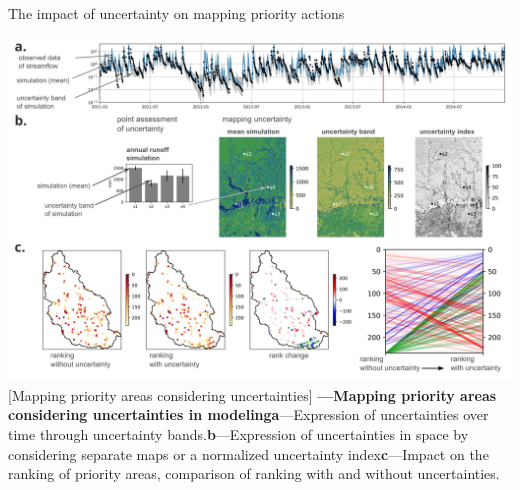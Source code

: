 \documentclass[./main_en.tex]{subfiles}
\begin{document}
\begin{simplebox}[
    float=ht!,
    label={highlight_uncertainty_maps},
    nameref={Uncertainty Maps}
    ]{The impact of uncertainty on mapping priority actions}
    \begin{minipage}[t]{\linewidth}
        \begin{minipage}[t]{\linewidth}
        \vspace*{5pt}
        	\includegraphics[width=\linewidth]{figs/fig_uncert_en.jpg}	
        	[Mapping priority areas considering uncertainties]{
                \textbf{---\;Mapping priority areas considering uncertainties in modeling}\;\textbf{a}\;---\;Expression of uncertainties over time through uncertainty bands.\;\textbf{b}\;---\;Expression of uncertainties in space by considering separate maps or a normalized uncertainty index\;\textbf{c}\;---\;Impact on the ranking of priority areas, comparison of ranking with and without uncertainties. 
        	}
            \label{fig:mapsuncer}  %
        \vspace*{5pt}
        \end{minipage}
    \end{minipage}
    
    \begin{minipage}[t]{\linewidth}
    

\end{minipage}
\end{simplebox}
\end{document}

